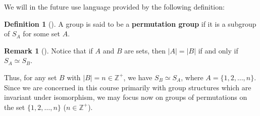 \documentclass[10pt,openany,oneside]{book}
\newcommand{\terminology}[1]{\textbf{#1}}
\theoremstyle{plain}
\theoremstyle{definition}
\newtheorem{definition}[theorem]{Definition}
\theoremstyle{definition}
\newtheorem{remark}[theorem]{Remark}
\theoremstyle{definition}
\theoremstyle{definition}
\numberwithin{equation}{section}
\def\Z{\mathbb{Z}}
\begin{document}
We will in the future use language provided by the following definition:%
\begin{definition}[{}]\label{definition-44}
A group is said to be a \terminology{permutation group} if it is a subgroup of \(S_A\) for some set \(A\).%
\end{definition}
\begin{remark}[]\label{remark-25}
Notice that if \(A\) and \(B\) are sets, then \(|A|=|B|\) if and only if \(S_A\simeq S_B\).%
\end{remark}
Thus, for any set \(B\) with \(|B|=n \in \Z^+\), we have \(S_B\simeq
S_A\), where \(A=\{1,2,\ldots,n\}\). Since we are concerned in this course primarily with group structures which are invariant under isomorphism, we may focus now on groups of permutations on the set \(\{1,2,\ldots, n\}\) (\(n\in \Z^+\)).%
\typeout{************************************************}
\typeout{************************************************}
\end{document}

